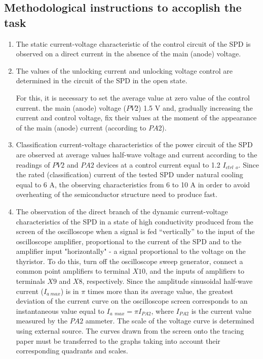 \documentclass[a4paper,14pt]{article}
\begin{document}
\subsection{Methodological instructions to accoplish the task}

\begin{enumerate}
\item The static current-voltage characteristic of the control circuit of the SPD is observed on a direct current
in the absence of the main (anode) voltage.

\item The values of the unlocking current and unlocking voltage control are determined in the circuit
of the SPD in the open state.

For this, it is necessary to set the average value at zero value of the control current.
the main (anode) voltage ($PV2$) 1.5 V and, gradually increasing the current and control voltage,
fix their values at the moment of the appearance of the main (anode) current (according to $PA$2).

\item Classification current-voltage characteristics of the power circuit of the SPD are observed at average values
half-wave voltage and current according to the readings of $PV2$ and $PA2$ devices at a control current equal to
1.2 $I_{ctrl\:\:o}$. Since the rated (classification) current of the tested SPD under natural cooling
equal to 6 A, the observing characteristics from 6 to 10 A in order to avoid overheating of the semiconductor structure
need to produce fast.

\item The observation of the direct branch of the dynamic current-voltage characteristics of the SPD 
in a state of high conductivity
produced from the screen of the oscilloscope when a signal 
is fed “vertically” to the input of the oscilloscope amplifier,
proportional to the current of the SPD and to the amplifier 
input "horizontally" - a signal proportional to the voltage
on the thyristor. To do this, turn off the oscilloscope sweep generator, connect a common point
amplifiers to terminal $X10$, and the inputs of amplifiers to terminals $X9$ and $X8$, respectively. 
Since the amplitude
sinusoidal half-wave current ($I_{a\:max}$) is in $\pi$ times more than its average value, 
the greatest deviation of the current curve on the oscilloscope screen corresponds 
to an instantaneous value equal to $I_{a\:\:max} = \pi I_{PA2}$,
where $I_{PA2}$ is the current value measured by the $PA2$ ammeter. 
The scale of the voltage curve is determined using external source. 
The curves drawn from the screen onto the tracing paper must be transferred to the graphs 
taking into account
their corresponding quadrants and scales.


\end{enumerate}
\end{document}
